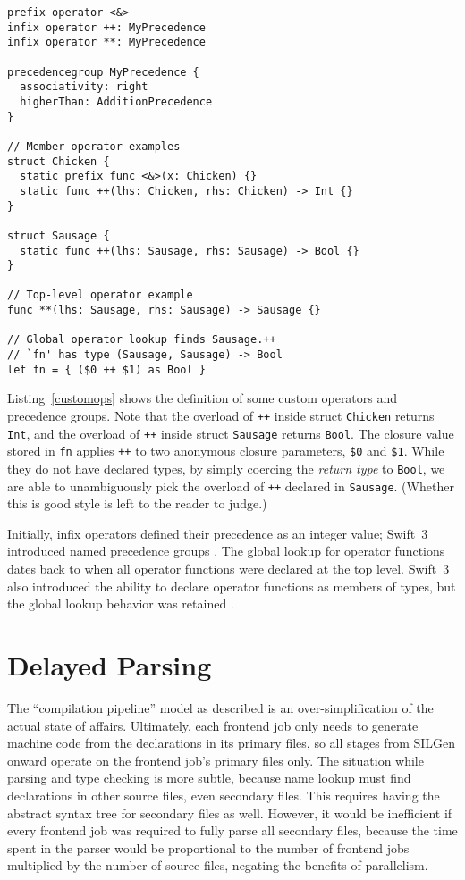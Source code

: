 \documentclass[../generics]{subfiles}
\begin{document}
\begin{listing}\label{customops}
\begin{Verbatim}
prefix operator <&>
infix operator ++: MyPrecedence
infix operator **: MyPrecedence

precedencegroup MyPrecedence {
  associativity: right
  higherThan: AdditionPrecedence
}

// Member operator examples
struct Chicken {
  static prefix func <&>(x: Chicken) {}
  static func ++(lhs: Chicken, rhs: Chicken) -> Int {}
}

struct Sausage {
  static func ++(lhs: Sausage, rhs: Sausage) -> Bool {}
}

// Top-level operator example
func **(lhs: Sausage, rhs: Sausage) -> Sausage {}

// Global operator lookup finds Sausage.++
// `fn' has type (Sausage, Sausage) -> Bool
let fn = { ($0 ++ $1) as Bool }
\end{Verbatim}
\end{listing}
Listing~\ref{customops} shows the definition of some custom operators and precedence groups. Note that the overload of \texttt{++} inside struct \texttt{Chicken} returns \texttt{Int}, and the overload of \texttt{++} inside struct \texttt{Sausage} returns \texttt{Bool}. The closure value stored in \texttt{fn} applies \texttt{++} to two anonymous closure parameters, \verb|$0| and \verb|$1|. While they do not have declared types, by simply coercing the \emph{return type} to \texttt{Bool}, we are able to unambiguously pick the overload of \texttt{++} declared in \texttt{Sausage}. (Whether this is good style is left to the reader to judge.)

Initially, infix operators defined their precedence as an integer value; Swift~3 introduced named precedence groups \cite{se0077}. The global lookup for operator functions dates back to when all operator functions were declared at the top level. Swift~3 also introduced the ability to declare operator functions as members of types, but the global lookup behavior was retained \cite{se0091}.

\section{Delayed Parsing}\label{delayed parsing}

The ``compilation pipeline'' model as described is an over-simplification of the actual state of affairs. Ultimately, each frontend job only needs to generate machine code from the declarations in its primary files, so all stages from SILGen onward operate on the frontend job's primary files only. The situation while parsing and type checking is more subtle, because name lookup must find declarations in other source files, even secondary files. This requires having the abstract syntax tree for secondary files as well. However, it would be inefficient if every frontend job was required to fully parse all secondary files, because the time spent in the parser would be proportional to the number of frontend jobs multiplied by the number of source files, negating the benefits of parallelism.
\end{document}
